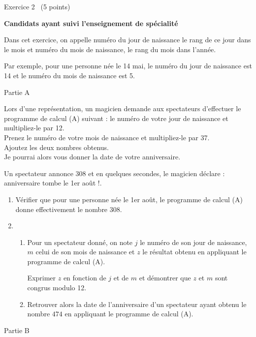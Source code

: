 
%
\begin{h2}Exercice 2  (5 points)\end{h2}
\textbf{Candidats ayant suivi l'enseignement de spécialité}
\par
Dans cet exercice, on appelle numéro du jour de naissance le rang de ce jour dans le mois et numéro du mois de naissance, le rang du mois dans l'année.
\par
Par exemple, pour une personne née le 14 mai, le numéro du jour de naissance est 14 et le numéro du mois de naissance est 5.
\begin{h3}Partie A\end{h3}
Lors d'une représentation, un magicien demande aux spectateurs d'effectuer le programme de calcul (A) suivant :
\ogPrenez le numéro de votre jour de naissance et multipliez-le par 12.
\\ Prenez le numéro de votre mois de naissance et multipliez-le par 37. 
\\Ajoutez les deux nombres obtenus. 
\\Je pourrai alors vous donner la date de votre anniversaire\fg{}.
\par
Un spectateur annonce 308 et en quelques secondes, le magicien déclare : \ogVotre anniversaire tombe le 1er août !\fg{}.
\begin{enumerate}
     \item
     Vérifier que pour une personne née le 1er août, le programme de calcul (A) donne effectivement le nombre $308$.
     \item
     \begin{enumerate}[label=\alph*.]
          \item
          Pour un spectateur donné, on note $j$ le numéro de son jour de naissance, $m$ celui de son mois de naissance et $z$ le résultat obtenu en appliquant le programme de calcul (A).
          \par
          Exprimer $z$ en fonction de $j$ et de $m$ et démontrer que $z$ et $m$ sont congrus modulo 12.
          \item
     Retrouver alors la date de l'anniversaire d'un spectateur ayant obtenu le nombre $474$ en appliquant le programme de calcul (A).\end{enumerate}
\end{enumerate}
\begin{h3}Partie B\end{h3}
